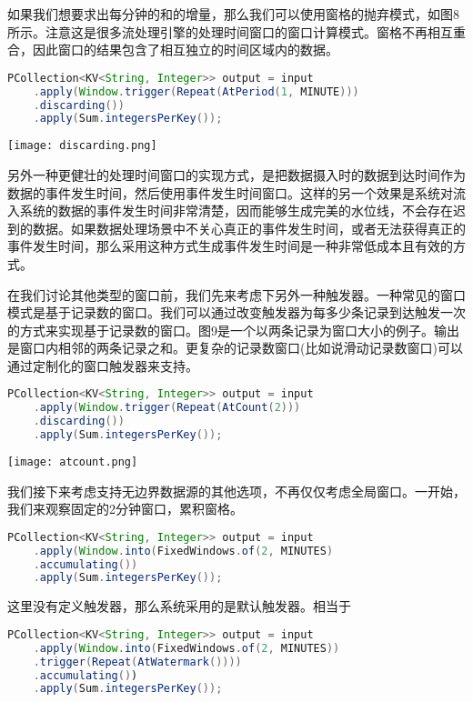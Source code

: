 \documentclass[oneside]{ctexbook}
\begin{document}
如果我们想要求出每分钟的和的增量，那么我们可以使用窗格的抛弃模式，如图8所示。注意这是很多流处理引擎的处理时间窗口的窗口计算模式。窗格不再相互重合，因此窗口的结果包含了相互独立的时间区域内的数据。

\begin{lstlisting}[language=java]
PCollection<KV<String, Integer>> output = input
    .apply(Window.trigger(Repeat(AtPeriod(1, MINUTE)))
    .discarding())
    .apply(Sum.integersPerKey());
\end{lstlisting}

\noindent \texttt{[image: discarding.png]}

另外一种更健壮的处理时间窗口的实现方式，是把数据摄入时的数据到达时间作为数据的事件发生时间，然后使用事件发生时间窗口。这样的另一个效果是系统对流入系统的数据的事件发生时间非常清楚，因而能够生成完美的水位线，不会存在迟到的数据。如果数据处理场景中不关心真正的事件发生时间，或者无法获得真正的事件发生时间，那么采用这种方式生成事件发生时间是一种非常低成本且有效的方式。

在我们讨论其他类型的窗口前，我们先来考虑下另外一种触发器。一种常见的窗口模式是基于记录数的窗口。我们可以通过改变触发器为每多少条记录到达触发一次的方式来实现基于记录数的窗口。图9是一个以两条记录为窗口大小的例子。输出是窗口内相邻的两条记录之和。更复杂的记录数窗口(比如说滑动记录数窗口)可以通过定制化的窗口触发器来支持。

\begin{lstlisting}[language=java]
PCollection<KV<String, Integer>> output = input
    .apply(Window.trigger(Repeat(AtCount(2)))
    .discarding())
    .apply(Sum.integersPerKey());
\end{lstlisting}

\noindent \texttt{[image: atcount.png]}

我们接下来考虑支持无边界数据源的其他选项，不再仅仅考虑全局窗口。一开始，我们来观察固定的2分钟窗口，累积窗格。

\begin{lstlisting}[language=java]
PCollection<KV<String, Integer>> output = input
    .apply(Window.into(FixedWindows.of(2, MINUTES)
    .accumulating())
    .apply(Sum.integersPerKey());
\end{lstlisting}

这里没有定义触发器，那么系统采用的是默认触发器。相当于

\begin{lstlisting}[language=java]
PCollection<KV<String, Integer>> output = input
    .apply(Window.into(FixedWindows.of(2, MINUTES))
    .trigger(Repeat(AtWatermark())))
    .accumulating())
    .apply(Sum.integersPerKey());
\end{lstlisting}
\end{document}
